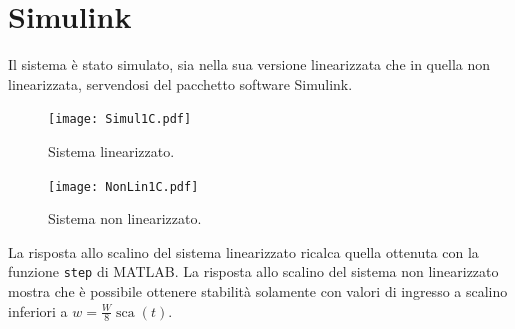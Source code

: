 \documentclass[a4paper]{article}
\DeclareMathOperator*{\sca}{\textrm{sca}}
\begin{document}
\section{Simulink}
Il sistema è stato simulato, sia nella sua versione linearizzata che in quella non linearizzata, servendosi del pacchetto software Simulink. 
\begin{figure}[h]
    \centering
    \texttt{[image: Simul1C.pdf]}
    \caption{Sistema linearizzato.}
    \label{fig:sim_lin}
\end{figure}
\begin{figure}[h]
    \centering
    \texttt{[image: NonLin1C.pdf]}
    \caption{Sistema non linearizzato.}
    \label{fig:sim_nonlin}
\end{figure}
La risposta allo scalino del sistema linearizzato ricalca quella ottenuta con la funzione \texttt{step} di MATLAB.
La risposta allo scalino del sistema non linearizzato mostra che è possibile ottenere stabilità solamente con valori di ingresso a scalino inferiori a $w = \frac{W}{8} \sca(t)$. 
\end{document}
